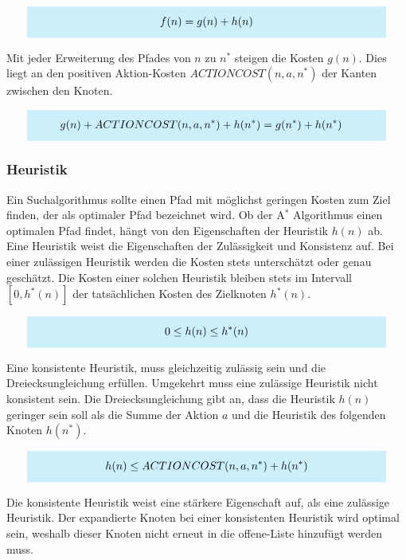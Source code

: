 \[
\highlightbox{0.9\textwidth}{$
    \begin{aligned}
			f(n) = g(n) + h(n)
    \end{aligned}
$}
\]

Mit jeder Erweiterung des Pfades von $n$ zu $n^{\ast}$ steigen die Kosten $g(n)$. Dies liegt an den positiven Aktion-Kosten $ACTIONCOST(n,a,n^*)$ der Kanten zwischen den Knoten.

\[
\highlightbox{0.9\textwidth}{$
    \begin{aligned}
			g(n) + ACTIONCOST(n,a,n^*) + h(n^*) &= g(n^*) + h(n^*)
    \end{aligned}
$}
\]

\subsubsection{Heuristik}

Ein Suchalgorithmus sollte einen Pfad mit möglichst geringen Kosten zum Ziel finden, der als optimaler Pfad bezeichnet wird. Ob der A$^*$ Algorithmus einen optimalen Pfad findet, hängt von den Eigenschaften der Heuristik $h(n)$ ab. Eine Heuristik weist die Eigenschaften der Zulässigkeit und Konsistenz auf. Bei einer zulässigen Heuristik werden die Kosten stets unterschätzt oder genau geschätzt. Die Kosten einer solchen Heuristik bleiben stets im Intervall $[0, h^{\ast}(n)]$ der tatsächlichen Kosten des Zielknoten $h^{\ast}(n)$.

\[
\highlightbox{0.9\textwidth}{$
    \begin{aligned}
			0 \leq h(n) \leq h^*(n)
    \end{aligned}
$}
\]

Eine konsistente Heuristik, muss gleichzeitig zulässig sein und die Dreiecksungleichung erfüllen. Umgekehrt muss eine zulässige Heuristik nicht konsistent sein. Die Dreiecksungleichung gibt an, dass die Heuristik $h(n)$ geringer sein soll als die Summe der Aktion $a$ und die Heuristik des folgenden Knoten $h(n^*)$.

\[
\highlightbox{0.9\textwidth}{$
    \begin{aligned}
			h(n) \leq ACTIONCOST(n,a,n^*) + h(n^*)
    \end{aligned}
$}
\]

Die konsistente Heuristik weist eine stärkere Eigenschaft auf, als eine zulässige Heuristik. Der expandierte Knoten bei einer konsistenten Heuristik wird optimal sein, weshalb dieser Knoten nicht erneut in die offene-Liste hinzufügt werden muss.

